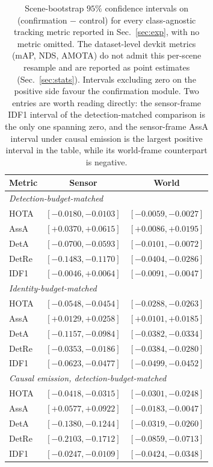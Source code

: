 \begin{table}[h]
\centering\footnotesize
\setlength{\tabcolsep}{3pt}
\begin{tabular}{lcc}
\toprule
Metric & Sensor & World \\
\midrule
\multicolumn{3}{l}{\emph{Detection-budget-matched}} \\
HOTA  & $[-0.0180, -0.0103]$ & $[-0.0059, -0.0027]$ \\
AssA  & $[+0.0370, +0.0615]$ & $[+0.0086, +0.0195]$ \\
DetA  & $[-0.0700, -0.0593]$ & $[-0.0101, -0.0072]$ \\
DetRe & $[-0.1483, -0.1170]$ & $[-0.0404, -0.0286]$ \\
IDF1  & $[-0.0046, +0.0064]$ & $[-0.0091, -0.0047]$ \\
\midrule
\multicolumn{3}{l}{\emph{Identity-budget-matched}} \\
HOTA  & $[-0.0548, -0.0454]$ & $[-0.0288, -0.0263]$ \\
AssA  & $[+0.0129, +0.0258]$ & $[+0.0101, +0.0185]$ \\
DetA  & $[-0.1157, -0.0984]$ & $[-0.0382, -0.0334]$ \\
DetRe & $[-0.0353, -0.0186]$ & $[-0.0384, -0.0280]$ \\
IDF1  & $[-0.0623, -0.0477]$ & $[-0.0499, -0.0452]$ \\
\midrule
\multicolumn{3}{l}{\emph{Causal emission, detection-budget-matched}} \\
HOTA  & $[-0.0418, -0.0315]$ & $[-0.0301, -0.0248]$ \\
AssA  & $[+0.0577, +0.0922]$ & $[-0.0183, -0.0047]$ \\
DetA  & $[-0.1380, -0.1244]$ & $[-0.0319, -0.0260]$ \\
DetRe & $[-0.2103, -0.1712]$ & $[-0.0859, -0.0713]$ \\
IDF1  & $[-0.0247, -0.0109]$ & $[-0.0424, -0.0348]$ \\
\bottomrule
\end{tabular}
\caption{Scene-bootstrap $95\%$ confidence intervals on
(confirmation $-$ control) for every class-agnostic tracking metric reported
in Sec.~\ref{sec:exp}, with no metric omitted. The dataset-level devkit
metrics (mAP, NDS, AMOTA) do not admit this per-scene resample and are
reported as point estimates (Sec.~\ref{sec:stats}). Intervals excluding zero
on the positive side favour the confirmation module. Two entries are worth
reading directly: the sensor-frame IDF1 interval of the detection-matched
comparison is the only one spanning zero, and the sensor-frame AssA interval
under causal emission is the largest positive interval in the table, while
its world-frame counterpart is negative.}
\label{tab:supp-ci}
\end{table}

